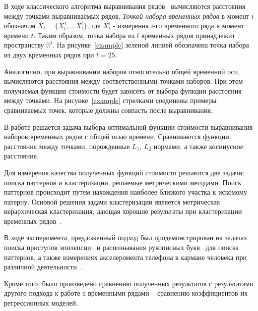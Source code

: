 \documentclass[12pt,twoside]{article}
\begin{document}
        В ходе классического алгоритма выравнивания рядов~\cite{??} вычисляются расстояния между точками выравниваемых рядов. \textit{Точкой набора временных рядов} в момент $t$ обозначим $X_t = \{X^1_t,\dots X^l_t\}$, где $X^i_t$ \-- измерения $i$\--го временного ряда в момент времени $t$. Таким образом, точка набора из $l$ временных рядов принадлежит пространству $\mathbb{R}^{l}$.  На рисунке~\ref{example} зеленой линией обозначена точка набора из двух временных рядов при $t=25$.
        
        Аналогично, при выравнивании наборов относительно общей временной оси, вычисляются расстояния между соответственными точками наборов. При этом получаемая функция стоимости будет зависеть от выбора функции расстояния между точками. На рисунке~\ref{example} стрелками соединены примеры сравниваемых точек, которые должны совпасть после выравнивания.

        В работе решается задача выбора оптимальной функции стоимости выравнивания наборов временных рядов с общей осью времени. Сравниваются функции расстояния между точками, порожденные $L_1$, $L_2$ нормами, а также косинусное расстояние.
        
        Для измерения качества полученных функций стоимости решаются две задачи: поиска паттернов и кластеризации, решаемые метрическими методами. Поиск паттернов происходит путем нахождения наиболее близкого участка к искомому патерну. Основой решения задачи кластеризации является метрическая иерархическая кластеризация, дающая хорошие результаты при кластеризации временных рядов~\cite{WARRENLIAO20051857,AGHABOZORGI201516}.
        
        В ходе эксперимента, предложенный подход был продемонстрирован на задачах поиска приступов эпилепсии~\cite{epi} и распознавания рукописных букв~\cite{characters} для поиска паттернов, а также измерениях акселеромента телефона в кармане человека при различной деятельности~\cite{Kwapisz:2011:ARU:1964897.1964918}.  
        
        
        
        Кроме того, было произведено сравнению полученных результатов с результатами другого подхода к работе с временными рядами -- сравнению коэффициентов их регрессионных моделей.
        
\end{document}
